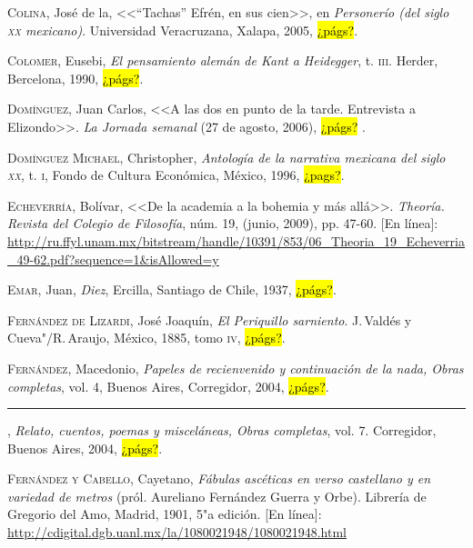 \documentclass[14pt,twoside,final]{extbook} %
\begin{document}
\textsc{Colina}, José de la, <<``Tachas'' Efrén, en sus cien>>, en \emph{Personerío (del siglo \textsc{xx} mexicano)}. Universidad Veracruzana, Xalapa, 2005, \hl{¿págs?}.\label{bib:colina2005}

\textsc{Colomer}, Eusebi, \emph{El pensamiento alemán de Kant a Heidegger}, t. \textsc{iii}. Herder, Bercelona, 1990, \hl{¿págs?}.\label{bib:colomer1990}

\textsc{Domínguez}, Juan Carlos, <<A las dos en punto de la tarde. Entrevista a Elizondo>>. \emph{La Jornada semanal} (27 de agosto, 2006), \hl{¿págs?} .\label{bib:dominguez2006}

\textsc{Domínguez Michael}, Christopher, \emph{Antología de la narrativa mexicana del siglo \textsc{xx}}, t. \textsc{i}, Fondo de Cultura Económica, México, 1996, \hl{¿pags?}.\label{bib:dominguez1996}

\textsc{Echeverría}, Bolívar, <<De la academia a la bohemia y más allá>>. \emph{Theoría. Revista del Colegio de Filosofía}, núm. 19, (junio, 2009), pp. 47-60. [En línea]: \url{http://ru.ffyl.unam.mx/bitstream/handle/10391/853/06_Theoria_19_Echeverria_49-62.pdf?sequence=1&isAllowed=y}\label{bib:echeverria2009}

\textsc{Emar}, Juan, \emph{Diez}, Ercilla, Santiago de Chile, 1937, \hl{¿págs?}.\label{bib:emar1937}

\textsc{Fernández de Lizardi}, José Joaquín, \emph{El Periquillo sarniento}. J.\,Valdés y Cueva"/R.\,Araujo, México, 1885, tomo \textsc{iv}, \hl{¿págs?}.\label{bib:fernandezlizardi1885}

\textsc{Fernández}, Macedonio, \emph{Papeles de recienvenido y continuación de la nada, Obras completas}, vol. 4, Buenos Aires, Corregidor, 2004, \hl{¿págs?}.\label{bib:fernandez2004a}

\rule{1cm}{0.4pt}, \emph{Relato, cuentos, poemas y misceláneas, Obras completas}, vol. 7. Corregidor, Buenos Aires, 2004, \hl{¿págs?}.\label{bib:fernandez2004b}

\textsc{Fernández y Cabello}, Cayetano, \emph{Fábulas ascéticas en verso castellano y en variedad de metros} (pról. Aureliano Fernández Guerra y Orbe). Librería de Gregorio del Amo, Madrid, 1901, 5"a edición. [En línea]: \url{http://cdigital.dgb.uanl.mx/la/1080021948/1080021948.html}
\end{document}
